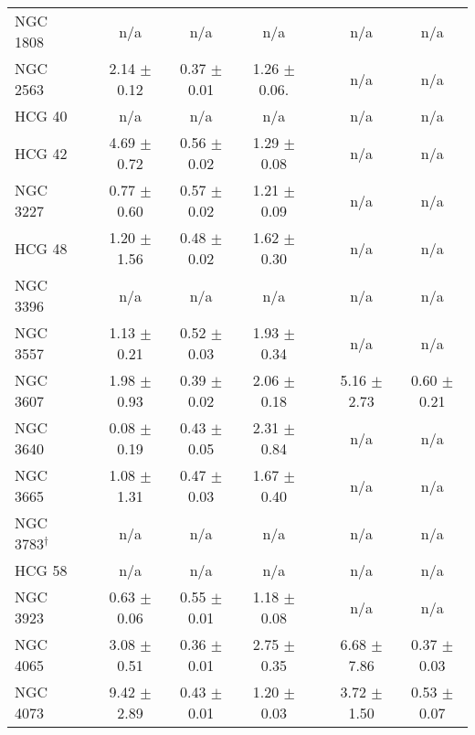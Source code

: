 \begin{table*}
\begin{center}
\begin{tabular}{@{}l@{}c@{\hspace{0.6cm}}ccc@{}c@{\hspace{0.6cm}}cc@{}}
NGC 1808              & &  n/a               &  n/a              &  n/a              & &  n/a               &  n/a              \\
NGC 2563              & &  2.14  $\pm$ 0.12  &  0.37 $\pm$ 0.01  &  1.26 $\pm$ 0.06. & &  n/a               &  n/a              \\
HCG 40                & &  n/a               &  n/a              &  n/a              & &  n/a               &  n/a              \\
HCG 42                & &  4.69  $\pm$ 0.72  &  0.56 $\pm$ 0.02  &  1.29 $\pm$ 0.08  & &  n/a               &  n/a              \\
NGC 3227              & &  0.77  $\pm$ 0.60  &  0.57 $\pm$ 0.02  &  1.21 $\pm$ 0.09  & &  n/a               &  n/a              \\
HCG 48                & &  1.20  $\pm$ 1.56  &  0.48 $\pm$ 0.02  &  1.62 $\pm$ 0.30  & &  n/a               &  n/a              \\
NGC 3396              & &  n/a               &  n/a              &  n/a              & &  n/a               &  n/a              \\
NGC 3557              & &  1.13  $\pm$ 0.21  &  0.52 $\pm$ 0.03  &  1.93 $\pm$ 0.34  & &  n/a               &  n/a              \\
NGC 3607              & &  1.98  $\pm$ 0.93  &  0.39 $\pm$ 0.02  &  2.06 $\pm$ 0.18  & &  5.16  $\pm$ 2.73  &  0.60 $\pm$ 0.21  \\
NGC 3640              & &  0.08  $\pm$ 0.19  &  0.43 $\pm$ 0.05  &  2.31 $\pm$ 0.84  & &  n/a               &  n/a              \\
NGC 3665              & &  1.08  $\pm$ 1.31  &  0.47 $\pm$ 0.03  &  1.67 $\pm$ 0.40  & &  n/a               &  n/a              \\
NGC 3783$^{\dagger}$  & &  n/a               &  n/a              &  n/a              & &  n/a               &  n/a              \\
HCG 58                & &  n/a               &  n/a              &  n/a              & &  n/a               &  n/a              \\
NGC 3923              & &  0.63  $\pm$ 0.06  &  0.55 $\pm$ 0.01  &  1.18 $\pm$ 0.08  & &  n/a               &  n/a              \\
NGC 4065              & &  3.08  $\pm$ 0.51  &  0.36 $\pm$ 0.01  &  2.75 $\pm$ 0.35  & &  6.68  $\pm$ 7.86  &  0.37 $\pm$ 0.03  \\
NGC 4073              & &  9.42  $\pm$ 2.89  &  0.43 $\pm$ 0.01  &  1.20 $\pm$ 0.03  & &  3.72  $\pm$ 1.50  &  0.53 $\pm$ 0.07  \\

\end{tabular}
\end{center}
\end{table*}
